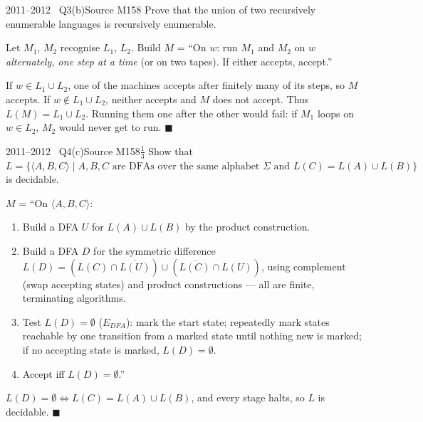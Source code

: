 \documentclass[11pt,a4paper]{article}
\begin{document}
\begin{question}{2011--2012 \textbullet\ Q3(b)}{Source M15}{8}
Prove that the union of two recursively enumerable languages is recursively enumerable.
\end{question}
\begin{solution}
Let $M_1$, $M_2$ recognise $L_1$, $L_2$. Build $M$ = ``On $w$: run $M_1$ and $M_2$ on $w$ \emph{alternately, one step at a time} (or on two tapes). If either accepts, accept.''

If $w\in L_1\cup L_2$, one of the machines accepts after finitely many of its steps, so $M$ accepts. If $w\notin L_1\cup L_2$, neither accepts and $M$ does not accept. Thus $L(M)=L_1\cup L_2$. Running them one after the other would fail: if $M_1$ loops on $w\in L_2$, $M_2$ would never get to run. \hfill$\blacksquare$
\end{solution}

\begin{question}{2011--2012 \textbullet\ Q4(c)}{Source M15}{8$\tfrac13$}
Show that $L=\{\langle A,B,C\rangle\mid A,B,C \text{ are DFAs over the same alphabet } \Sigma \text{ and } L(C)=L(A)\cup L(B)\}$ is decidable.
\end{question}
\begin{solution}
$M$ = ``On $\langle A,B,C\rangle$:
\begin{enumerate}
\item Build a DFA $U$ for $L(A)\cup L(B)$ by the product construction.
\item Build a DFA $D$ for the symmetric difference $L(D)=(L(C)\cap\overline{L(U)})\cup(\overline{L(C)}\cap L(U))$, using complement (swap accepting states) and product constructions --- all are finite, terminating algorithms.
\item Test $L(D)=\emptyset$ ($E_{DFA}$): mark the start state; repeatedly mark states reachable by one transition from a marked state until nothing new is marked; if no accepting state is marked, $L(D)=\emptyset$.
\item Accept iff $L(D)=\emptyset$.''
\end{enumerate}
$L(D)=\emptyset\iff L(C)=L(A)\cup L(B)$, and every stage halts, so $L$ is decidable. \hfill$\blacksquare$
\end{solution}
\end{document}
